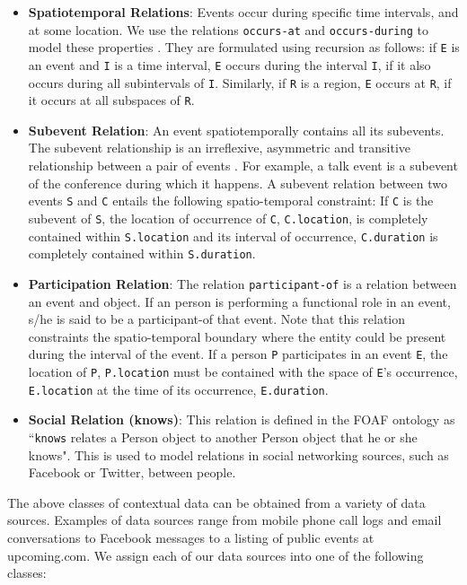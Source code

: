 \begin{itemize}
\item \textbf{Spatiotemporal Relations}: Events occur during specific time intervals, and at some location. We use the relations \texttt{occurs-at} and \texttt{occurs-during} to model these properties \cite{gupta2011managing}. They are formulated using recursion as follows: if \texttt{E} is an event and \texttt{I} is a time interval, \texttt{E} occurs during the interval \texttt{I}, if it also occurs during all subintervals of \texttt{I}. Similarly, if \texttt{R} is a region, \texttt{E} occurs at \texttt{R}, if it occurs at all subspaces of \texttt{R}.

\item \textbf{Subevent Relation}: An event spatiotemporally contains all its subevents. The subevent relationship is an irreflexive, asymmetric and transitive relationship between a pair of events \cite{gupta2011managing}. For example, a talk event is a subevent of the conference during which it happens. A subevent relation between two events \texttt{S} and \texttt{C} entails the following spatio-temporal constraint: If \texttt{C} is the subevent of \texttt{S}, the location of occurrence of \texttt{C}, \texttt{C.location}, is completely contained within \texttt{S.location} and its interval of occurrence, \texttt{C.duration} is completely contained within \texttt{S.duration}.

\item \textbf{Participation Relation}: The relation \texttt{participant-of} is a relation between an event and object. If an person is performing a functional role in an event, s/he is said to be a participant-of that event. Note that this relation constraints the spatio-temporal boundary where the entity could be present during the interval of the event. If a person \texttt{P} participates in an event \texttt{E}, the location of \texttt{P}, \texttt{P.location} must be contained with the space of \texttt{E}'s occurrence, \texttt{E.location} at the time of its occurrence, \texttt{E.duration}.

\item \textbf{Social Relation (knows)}: This relation is defined in the FOAF ontology \cite{brickley2010foaf} as ``\texttt{knows} relates a Person object to another Person object that he or she knows". This is used to model relations in social networking sources, such as Facebook or Twitter, between people.
\end{itemize}

The above classes of contextual data can be obtained from a variety of data sources. Examples of data sources range from mobile phone call logs and email conversations to Facebook messages to a listing of public events at upcoming.com. We assign each of our data sources into one of the following classes:

